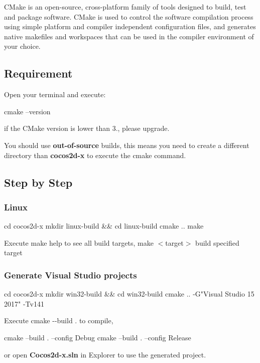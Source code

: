 C\+Make is an open-\/source, cross-\/platform family of tools designed to build, test and package software. C\+Make is used to control the software compilation process using simple platform and compiler independent configuration files, and generates native makefiles and workspaces that can be used in the compiler environment of your choice.

\subsection*{Requirement}


\begin{DoxyEnumerate}
\item Open your terminal and execute\+: 
\begin{DoxyCode}
cmake --version
\end{DoxyCode}
 if the C\+Make version is lower than 3., please upgrade.
\item You should use {\bfseries out-\/of-\/source} builds, this means you need to create a different directory than {\bfseries cocos2d-\/x} to execute the {\ttfamily cmake} command.
\end{DoxyEnumerate}

\subsection*{Step by Step}

\subsubsection*{Linux}


\begin{DoxyCode}
cd cocos2d-x
mkdir linux-build && cd linux-build
cmake ..
make
\end{DoxyCode}


Execute {\ttfamily make help} to see all build targets, {\ttfamily make $<$target$>$} build specified target

\subsubsection*{Generate Visual Studio projects}


\begin{DoxyCode}
cd cocos2d-x
mkdir win32-build && cd win32-build
cmake .. -G"Visual Studio 15 2017" -Tv141
\end{DoxyCode}


Execute {\ttfamily cmake -\/-\/build .} to compile, 
\begin{DoxyCode}
cmake --build . --config Debug
cmake --build . --config Release
\end{DoxyCode}
 or open {\bfseries Cocos2d-\/x.\+sln} in Explorer to use the generated project.

